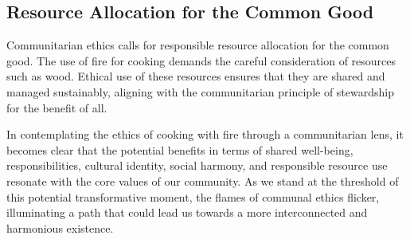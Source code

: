 \subsection{Resource Allocation for the Common Good}
Communitarian ethics calls for responsible resource allocation for the common good. The use of fire for cooking demands the careful consideration of resources such as wood. Ethical use of these resources ensures that they are shared and managed sustainably, aligning with the communitarian principle of stewardship for the benefit of all.

In contemplating the ethics of cooking with fire through a communitarian lens, it becomes clear that the potential benefits in terms of shared well-being, responsibilities, cultural identity, social harmony, and responsible resource use resonate with the core values of our community. As we stand at the threshold of this potential transformative moment, the flames of communal ethics flicker, illuminating a path that could lead us towards a more interconnected and harmonious existence.